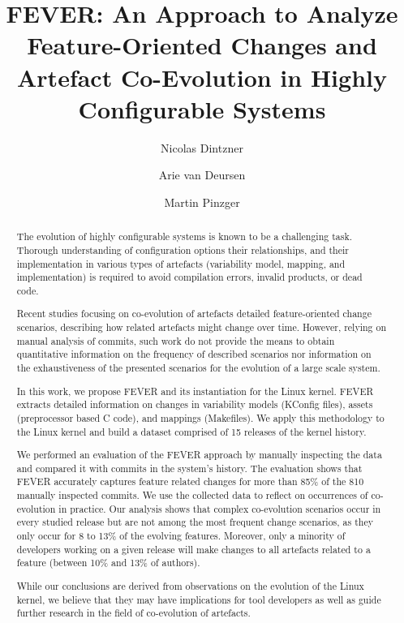 \documentclass[smallextended]{svjour3}
\begin{document}
\title{FEVER: An Approach to Analyze Feature-Oriented Changes and Artefact Co-Evolution in Highly Configurable Systems}

\author{Nicolas Dintzner \and Arie van Deursen \and Martin Pinzger}


\maketitle

\begin{abstract}
The evolution of highly configurable systems is known to be a challenging task. Thorough understanding of configuration options
their relationships, and their implementation in various types of artefacts (variability model, mapping, and implementation) is required
to avoid compilation errors, invalid products, or dead code.

	Recent studies focusing on co-evolution of artefacts detailed feature-oriented change scenarios, describing how
related artefacts might change over time. However, relying on manual analysis of commits, such work
do not provide the means to obtain quantitative information on the frequency of described scenarios nor
information on the exhaustiveness of the presented scenarios for the evolution of a large scale system.

	In this work, we propose FEVER and its instantiation for the Linux kernel. 
FEVER extracts detailed information on changes in variability models (KConfig files), assets (preprocessor based C code), and mappings (Makefiles).
We apply this methodology to the Linux kernel and build a dataset comprised of 15 releases of the kernel history.

	We performed an evaluation of the FEVER approach by manually inspecting the data and compared it
with commits in the system's history. The evaluation shows that FEVER accurately captures feature related changes
for more than 85\% of the 810 manually inspected commits.
We use the collected data to reflect on occurrences of co-evolution in practice. 
Our analysis shows that complex co-evolution scenarios occur in every studied release but are not among
the most frequent change scenarios, as they only occur for 8 to 13\% of the evolving features.
Moreover, only a minority of developers working on a given release 
will make changes to all artefacts related to a feature (between 10\% and 13\% of authors).

	While our conclusions are derived from observations on the evolution of the Linux kernel, we believe that they may have
implications for tool developers as well as guide further research in the field of co-evolution of artefacts.
\end{abstract}
\end{document}
